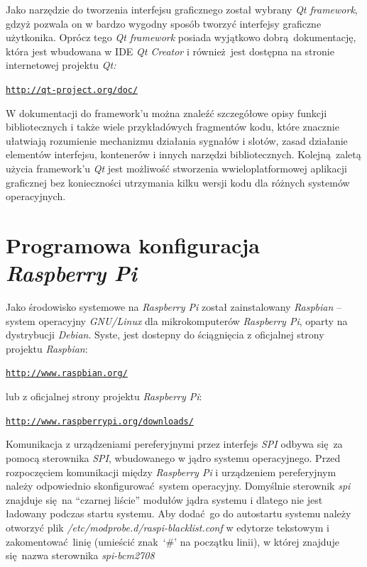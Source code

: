 \documentclass[eng,printmode]{mgr}
\begin{document}
Jako narzędzie do tworzenia interfejsu graficznego został wybrany \emph{Qt framework}, gdzyż pozwala on w bardzo wygodny sposób tworzyć interfejsy graficzne użytkonika. Oprócz tego \emph{Qt framework} posiada wyjątkowo dobrą dokumentację, która jest wbudowana w IDE \emph{Qt Creator} i również jest dostępna na stronie internetowej projektu \emph{Qt:} 

\begin{alltt}
    \url{http://qt-project.org/doc/}
\end{alltt}

W dokumentacji do framework'u można znaleźć szczegółowe opisy funkcji bibliotecznych i także wiele przykładówych fragmentów kodu, które znacznie ułatwiają rozumienie mechanizmu działania sygnałów i slotów, zasad działanie elementów interfejsu, kontenerów i innych narzędzi bibliotecznych. Kolejną zaletą użycia framework'u \emph{Qt} jest możliwość stworzenia wwieloplatformowej aplikacji graficznej bez konieczności utrzymania kilku wersji kodu dla różnych systemów operacyjnych. 



\section{Programowa konfiguracja \emph{Raspberry Pi}}
Jako środowisko systemowe na \emph{Raspberry Pi} został zainstalowany \emph{Raspbian} -- system operacyjny \emph{GNU/Linux} dla mikrokomputerów \emph{Raspberry Pi}, oparty na dystrybucji \emph{Debian}. Syste, jest dostepny do ściągnięcia z oficjalnej strony projektu \emph{Raspbian}: 

\begin{alltt}
    \url{http://www.raspbian.org/} 
\end{alltt}

lub z oficjalnej strony projektu \emph{Raspberry Pi}:

\begin{alltt}
    \url{http://www.raspberrypi.org/downloads/}
\end{alltt}

Komunikacja z urządzeniami pereferyjnymi przez interfejs \emph{SPI} odbywa się za pomocą sterownika \emph{SPI}, wbudowanego w jądro systemu operacyjnego. Przed rozpoczęciem komunikacji między \emph{Raspberry Pi} i urządzeniem pereferyjnym należy odpowiednio skonfigurować system operacyjny.
Domyślnie sterownik \emph{spi} znajduje się na ``czarnej liście'' modułów jądra systemu i dlatego nie jest ładowany podczas startu systemu.
Aby dodać go do autostartu systemu należy otworzyć plik \emph{/etc/modprobe.d/raspi-blacklist.conf} w edytorze tekstowym i zakomentować linię (umieścić znak `\#' na początku linii), w której znajduje się nazwa sterownika \emph{spi-bcm2708}
\end{document}
